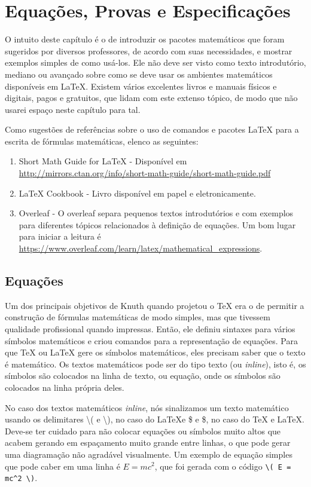 \chapter{Equações, Provas e Especificações}\label{cap:equa}

O intuito deste capítulo é o de introduzir os pacotes matemáticos que foram sugeridos por diversos professores, de acordo com suas necessidades, e mostrar exemplos simples de como usá-los. Ele não deve ser visto como texto introdutório, mediano ou avançado sobre como se deve usar os ambientes matemáticos disponíveis em \LaTeX{}. Existem vários excelentes livros e manuais físicos e digitais, pagos e gratuitos, que lidam com este extenso tópico, de modo que não usarei espaço neste capítulo para tal.

Como sugestões de referências sobre o uso de comandos e pacotes \LaTeX{} para a escrita de fórmulas matemáticas, elenco as seguintes:
\begin{enumerate}
	\item Short Math Guide for \LaTeX{} - Disponível em  \url{http://mirrors.ctan.org/info/short-math-guide/short-math-guide.pdf}
	\item \LaTeX{} Cookbook \parencite{Kottwitz2015} - Livro disponível em papel e eletronicamente.
	\item Overleaf - O \gls{overleaf} separa pequenos textos introdutórios e com exemplos para diferentes tópicos relacionados à definição de equações. Um bom lugar para iniciar a leitura é \url{https://www.overleaf.com/learn/latex/mathematical_expressions}.
\end{enumerate}

\section{Equações}

Um dos principais objetivos de Knuth quando projetou o \TeX{} era o de permitir a construção de fórmulas matemáticas de modo simples, mas que tivessem qualidade profissional quando impressas. Então, ele definiu sintaxes para vários símbolos matemáticos e criou comandos para a representação de equações. 
Para que \TeX{} ou \LaTeX{} gere os símbolos matemáticos, eles precisam saber que o texto é matemático. Os textos matemáticos pode ser do tipo texto (ou \textit{inline}), isto é, os símbolos são colocados na linha de texto, ou equação, onde os símbolos são colocados na linha própria deles.

No caso dos textos matemáticos \textit{inline}, nós sinalizamos um texto matemático usando os delimitares \textbackslash ( e \textbackslash ), no caso do \LaTeX e \$ e \$, no caso do \TeX{} e \LaTeX{}. Deve-se ter cuidado para não colocar equações ou símbolos muito altos que acabem gerando em espaçamento muito grande entre linhas, o que pode gerar uma diagramação não agradável visualmente. Um exemplo de equação simples que pode caber em uma linha é \( E = m c^2 \), que foi gerada com o código
\texttt{\textbackslash ( E = mc\^{}2 \textbackslash )}.

